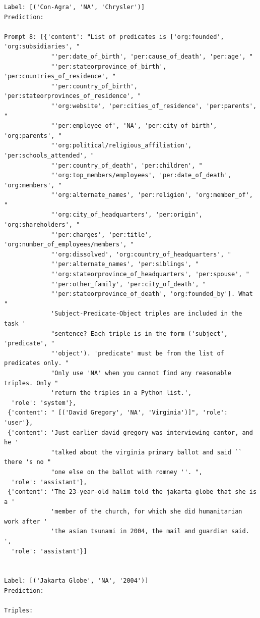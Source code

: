 \documentclass{article}
\begin{document}
\begin{lstlisting}
Label: [('Con-Agra', 'NA', 'Chrysler')]
Prediction: 

Prompt 8: [{'content': "List of predicates is ['org:founded', 'org:subsidiaries', "
             "'per:date_of_birth', 'per:cause_of_death', 'per:age', "
             "'per:stateorprovince_of_birth', 'per:countries_of_residence', "
             "'per:country_of_birth', 'per:stateorprovinces_of_residence', "
             "'org:website', 'per:cities_of_residence', 'per:parents', "
             "'per:employee_of', 'NA', 'per:city_of_birth', 'org:parents', "
             "'org:political/religious_affiliation', 'per:schools_attended', "
             "'per:country_of_death', 'per:children', "
             "'org:top_members/employees', 'per:date_of_death', 'org:members', "
             "'org:alternate_names', 'per:religion', 'org:member_of', "
             "'org:city_of_headquarters', 'per:origin', 'org:shareholders', "
             "'per:charges', 'per:title', 'org:number_of_employees/members', "
             "'org:dissolved', 'org:country_of_headquarters', "
             "'per:alternate_names', 'per:siblings', "
             "'org:stateorprovince_of_headquarters', 'per:spouse', "
             "'per:other_family', 'per:city_of_death', "
             "'per:stateorprovince_of_death', 'org:founded_by']. What "
             'Subject-Predicate-Object triples are included in the task '
             "sentence? Each triple is in the form ('subject', 'predicate', "
             "'object'). 'predicate' must be from the list of predicates only. "
             "Only use 'NA' when you cannot find any reasonable triples. Only "
             'return the triples in a Python list.',
  'role': 'system'},
 {'content': " [('David Gregory', 'NA', 'Virginia')]", 'role': 'user'},
 {'content': 'Just earlier david gregory was interviewing cantor, and he '
             "talked about the virginia primary ballot and said `` there 's no "
             "one else on the ballot with romney ''. ",
  'role': 'assistant'},
 {'content': 'The 23-year-old halim told the jakarta globe that she is a '
             'member of the church, for which she did humanitarian work after '
             'the asian tsunami in 2004, the mail and guardian said. ',
  'role': 'assistant'}]


Label: [('Jakarta Globe', 'NA', '2004')]
Prediction: 

Triples:


\end{lstlisting}
\end{document}
